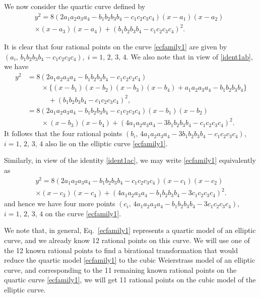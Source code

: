 \documentclass[11pt, leqno]{article}
\begin{document}
We now consider the quartic curve defined by
\begin{multline}
y^2=8(2a_1a_2a_3a_4-b_1b_2b_3b_4-c_1c_2c_3c_4)(x-a_1)(x-a_2)\\
\times (x-a_3)(x-a_4)+(b_1b_2b_3b_4-c_1c_2c_3c_4)^2.\quad \quad \quad \quad \quad \quad \label{ecfamily1}
\end{multline}

It is clear that four rational points on the  curve \eqref{ecfamily1} are given by $(a_i,\,b_1b_2b_3b_4-c_1c_2c_3c_4), \;i=1,\,2,\,3,\,4$. We also note that in view of \eqref{ident1ab}, we have
\begin{equation*}
\begin{aligned}
y^2&=8(2a_1a_2a_3a_4-b_1b_2b_3b_4-c_1c_2c_3c_4)\\
& \quad \quad \times \{(x-b_1)(x-b_2)(x-b_3)(x-b_4)+a_1a_2a_3a_4-b_1b_2b_3b_4\}\\
& \quad \quad \quad +(b_1b_2b_3b_4-c_1c_2c_3c_4)^2,\\
&=8(2a_1a_2a_3a_4-b_1b_2b_3b_4-c_1c_2c_3c_4)(x-b_1)(x-b_2)\\
& \quad \quad \times (x-b_3)(x-b_4)+(4a_1a_2a_3a_4-3b_1b_2b_3b_4-c_1c_2c_3c_4)^2.
\end{aligned}
\end{equation*}
It follows that the four rational points $(b_i, \, 4a_1a_2a_3a_4-3b_1b_2b_3b_4-c_1c_2c_3c_4)$,\; $i=1,\,2,\,3,\,4$ also lie on the elliptic curve \eqref{ecfamily1}. 

Similarly, in view of the identity \eqref{ident1ac}, we may write \eqref{ecfamily1} equivalently as 
\begin{multline*}
y^2=8(2a_1a_2a_3a_4-b_1b_2b_3b_4-c_1c_2c_3c_4)(x-c_1)(x-c_2)\\
\times (x-c_3)(x-c_4) +(4a_1a_2a_3a_4-b_1b_2b_3b_4-3c_1c_2c_3c_4)^2.
\end{multline*}
and hence we have four more points $(c_i,\,4a_1a_2a_3a_4-b_1b_2b_3b_4-3c_1c_2c_3c_4)$,\;  $i=1,\,2,\,3,\,4$ on the curve \eqref{ecfamily1}.

We note that, in general, Eq.~\eqref{ecfamily1} represents a quartic model of an elliptic curve, and we already know  12 rational points on this  curve. We will use one of the 12 known rational points to  find a birational transformation that would reduce the quartic model \eqref{ecfamily1} to the cubic Weierstrass model of an elliptic curve, and corresponding to the 11 remaining known rational points on the quartic curve \eqref{ecfamily1}, we will get  11 rational points on the cubic model of the elliptic curve.  
\end{document}
